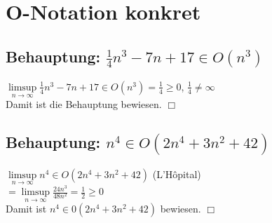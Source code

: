 \section{O-Notation konkret}
\subsection{Behauptung: $\frac{1}{4}n^3-7n+17 \in O (n^3)$}
$\limsup\limits_{n \to \infty} \frac{1}{4}n^3-7n+17 \in O (n^3)= \frac{1}{4} \geq 0$, $\frac{1}{4} \neq \infty$\\
Damit ist die Behauptung bewiesen. \hspace{2cm} $\Box$
\subsection{Behauptung: $n^4 \in O(2n^4+3n^2+42)$}
$\limsup\limits_{n \to \infty} n^4 \in O(2n^4+3n^2+42)$ (L'Hôpital)\\
\hspace*{44mm}$=\limsup\limits_{n \to \infty} \frac{24n^3}{48n^2}= \frac{1}{2} \geq 0$\\
Damit ist $n^4 \in 0 (2n^4 + 3n^2+ 42)$ bewiesen. \hspace{2cm} $\Box$
